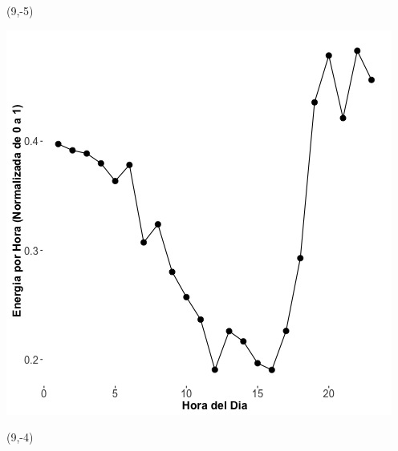 \documentclass{article}\usepackage[]{graphicx}\usepackage[]{color}
\newenvironment{knitrout}{}{} %
\begin{document}
 \begin{textblock}{1}(9,-5)
\begin{minipage}{20em}
\begingroup

\endgroup
\end{minipage}
\end{textblock}

\begin{knitrout}
\color{fgcolor}
\includegraphics[scale=0.65]{figure/A3_plot_norm_median} 
\end{knitrout}


 \begin{textblock}{1}(9,-4)
\begin{minipage}{20em}
\begingroup

\endgroup
\end{minipage}
\end{textblock}
\end{document}
